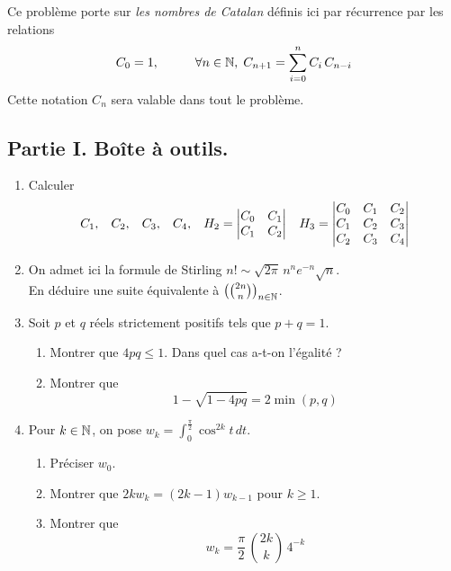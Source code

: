Ce problème porte sur \emph{les nombres de Catalan} définis ici par récurrence par les relations
\begin{displaymath}
C_0=1,\hspace{1cm}\forall n\in \mathbb{N},\; C_{n+1} = \sum_{i=0}^{n}C_i\,C_{n-i}  
\end{displaymath}
Cette notation $C_n$ sera valable dans tout le problème.

\subsection*{Partie I. Boîte à outils.}
\begin{enumerate}
  \item Calculer 
\begin{displaymath}
  C_1,\hspace{0.3cm} C_2,\hspace{0.3cm} C_3,\hspace{0.3cm} C_4,\hspace{0.3cm}
  H_2 =
  \begin{vmatrix}
    C_0 & C_1 \\ C_1 & C_2
  \end{vmatrix}
  \hspace{0.3cm}
  H_3 =
  \begin{vmatrix}
    C_0 & C_1 & C_2 \\ C_1 & C_2 & C_3 \\ C_2 & C_3 & C_4
  \end{vmatrix}
\end{displaymath}

\item On admet ici la formule de Stirling $n! \sim \sqrt{2\pi}\, n^n e^{-n} \sqrt{n}$.\\ En déduire une suite équivalente à $\left( \binom{2n}{n}\right)_{n\in \mathbb{N}} $.

\item Soit $p$ et $q$ réels strictement positifs tels que $p+q=1$.
\begin{enumerate}
  \item Montrer que $4pq\leq 1$. Dans quel cas a-t-on l'égalité ?
  \item Montrer que 
\begin{displaymath}
  1-\sqrt{1-4pq} = 2\min(p,q)
\end{displaymath}
\end{enumerate} 

\item Pour $k\in \mathbb{N}$, on pose $w_k = \int_{0}^{\frac{\pi}{2}}\cos^{2k}t\, dt$.
\begin{enumerate}
  \item Préciser $w_0$.
  \item Montrer que $2kw_k = (2k-1) w_{k-1}$ pour $k\geq 1$.
  \item Montrer que 
\begin{displaymath}
  w_k = \frac{\pi}{2}\, \binom{2k}{k}\, 4^{-k}
\end{displaymath}
\end{enumerate}

\end{enumerate}



